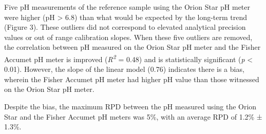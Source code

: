 \documentclass[
]{article}
\begin{document}
Five pH measurements of the reference sample using the Orion Star pH
meter were higher (pH \textgreater{} 6.8) than what would be expected by
the long-term trend (Figure 3). These outliers did not correspond to
elevated analytical precision values or out of range calibration slopes.
When these five outliers are removed, the correlation between pH
measured on the Orion Star pH meter and the Fisher Accumet pH meter is
improved (\emph{R\textsuperscript{2}} = 0.48) and is statistically
significant (\emph{p} \textless{} 0.01). However, the slope of the
linear model (0.76) indicates there is a bias, wherein the Fisher
Accumet pH meter had higher pH value than those witnessed on the Orion
Star pH meter.

Despite the bias, the maximum RPD between the pH measured using the
Orion Star and the Fisher Accumet pH meters was 5\%, with an average RPD
of 1.2\% ± 1.3\%.
\end{document}
